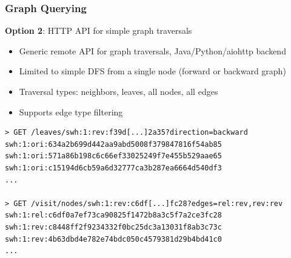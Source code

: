 \documentclass[aspectratio=169,xcolor=table]{beamer}
\begin{document}
    \begin{frame}[fragile]
        \frametitle{Graph Querying}

        \begin{block}{}
            \textbf{Option 2}: HTTP API for simple graph traversals

            \begin{itemize}
                \item Generic remote API for graph traversals, Java/Python/aiohttp backend
                \item Limited to simple DFS from a single node (forward or
                    backward graph)
                \item Traversal types: neighbors, leaves, all nodes, all edges
                \item Supports edge type filtering
            \end{itemize}
        \end{block}

        \begin{verbatim}
> GET /leaves/swh:1:rev:f39d[...]2a35?direction=backward
swh:1:ori:634a2b699d442aa9abd5008f379847816f54ab85
swh:1:ori:571a86b198c6c66ef33025249f7e455b529aae65
swh:1:ori:c15194d6cb59a6d32777ca3b287ea6664d540df3
...

> GET /visit/nodes/swh:1:rev:c6df[...]fc28?edges=rel:rev,rev:rev
swh:1:rel:c6df0a7ef73ca90825f1472b8a3c5f7a2ce3fc28
swh:1:rev:c8448ff2f9234332f0bc25dc3a13031f8ab3c73c
swh:1:rev:4b63dbd4e782e74bdc050c4579381d29b4bd41c0
...
        \end{verbatim}
    \end{frame}
\end{document}
